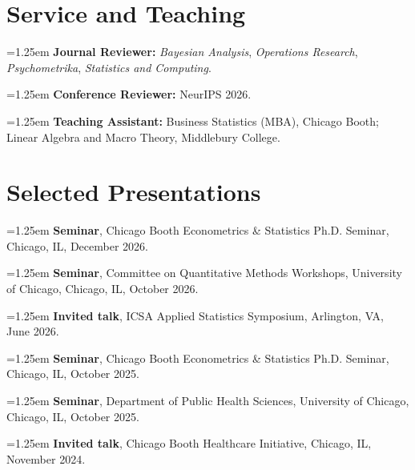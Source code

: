 \documentclass[11pt,letterpaper]{article}
\newcommand{\hangentry}[1]{%
  \par\noindent\hangindent=1.25em\hangafter=1 #1\par
}
\begin{document}
\section*{Service and Teaching}

\hangentry{
\textbf{Journal Reviewer:}
\textit{Bayesian Analysis},
\textit{Operations Research},
\textit{Psychometrika},
\textit{Statistics and Computing}.
}

\vspace{0.18em}

\hangentry{
\textbf{Conference Reviewer:}
NeurIPS 2026.
}

\vspace{0.18em}

\hangentry{
\textbf{Teaching Assistant:}
Business Statistics (MBA), Chicago Booth;
Linear Algebra and Macro Theory, Middlebury College.
}

\section*{Selected Presentations}

\hangentry{
\textbf{Seminar},
Chicago Booth Econometrics \& Statistics Ph.D. Seminar,
Chicago, IL, December 2026.
}

\vspace{0.16em}

\hangentry{
\textbf{Seminar},
Committee on Quantitative Methods Workshops,
University of Chicago,
Chicago, IL, October 2026.
}

\vspace{0.16em}

\hangentry{
\textbf{Invited talk},
ICSA Applied Statistics Symposium,
Arlington, VA, June 2026.
}

\vspace{0.16em}

\hangentry{
\textbf{Seminar},
Chicago Booth Econometrics \& Statistics Ph.D. Seminar,
Chicago, IL, October 2025.
}

\vspace{0.16em}

\hangentry{
\textbf{Seminar},
Department of Public Health Sciences,
University of Chicago,
Chicago, IL, October 2025.
}

\vspace{0.16em}

\hangentry{
\textbf{Invited talk},
Chicago Booth Healthcare Initiative,
Chicago, IL, November 2024.
}
\end{document}
